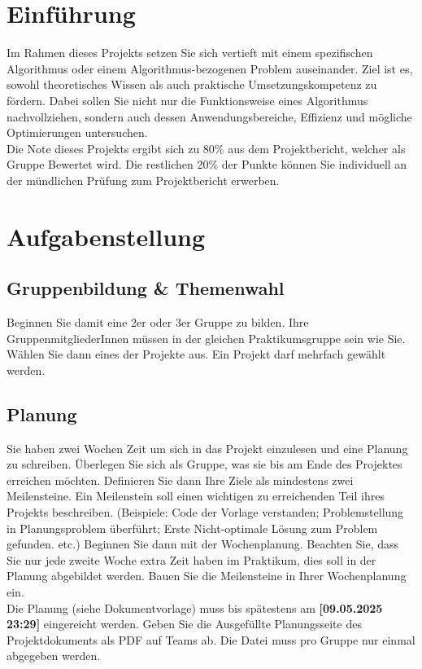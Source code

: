 \documentclass[12pt, a4]{article}
\begin{document}
\section{Einführung}

Im Rahmen dieses Projekts setzen Sie sich vertieft mit einem spezifischen Algorithmus oder einem Algorithmus-bezogenen Problem auseinander.
Ziel ist es, sowohl theoretisches Wissen als auch praktische Umsetzungskompetenz zu fördern.
Dabei sollen Sie nicht nur die Funktionsweise eines Algorithmus nachvollziehen, sondern auch dessen Anwendungsbereiche, Effizienz und mögliche Optimierungen untersuchen.\\
Die Note dieses Projekts ergibt sich zu 80\% aus dem Projektbericht, welcher als Gruppe Bewertet wird.
Die restlichen 20\% der Punkte können Sie individuell an der mündlichen Prüfung zum Projektbericht erwerben.

\section{Aufgabenstellung}

\subsection*{Gruppenbildung \& Themenwahl}
Beginnen Sie damit eine 2er oder 3er Gruppe zu bilden.
Ihre GruppenmitgliederInnen müssen in der gleichen Praktikumsgruppe sein wie Sie.
Wählen Sie dann eines der Projekte aus.
Ein Projekt darf mehrfach gewählt werden.

\subsection*{Planung}
Sie haben zwei Wochen Zeit um sich in das Projekt einzulesen und eine Planung zu schreiben.
Überlegen Sie sich als Gruppe, was sie bis am Ende des Projektes erreichen möchten.
Definieren Sie dann Ihre Ziele als mindestens zwei Meilensteine.
Ein Meilenstein soll einen wichtigen zu erreichenden Teil ihres Projekts beschreiben. (Beispiele: Code der Vorlage verstanden; Problemstellung in Planungsproblem überführt; Erste Nicht-optimale Lösung zum Problem gefunden. etc.)
Beginnen Sie dann mit der Wochenplanung.
Beachten Sie, dass Sie nur jede zweite Woche extra Zeit haben im Praktikum, dies soll in der Planung abgebildet werden.
Bauen Sie die Meilensteine in Ihrer Wochenplanung ein. \\
Die Planung (siehe Dokumentvorlage) muss bis spätestens am \textbf{[09.05.2025 23:29]} eingereicht werden.
Geben Sie die Ausgefüllte Planungsseite des Projektdokuments als PDF auf Teams ab.
Die Datei muss pro Gruppe nur einmal abgegeben werden.
\end{document}
